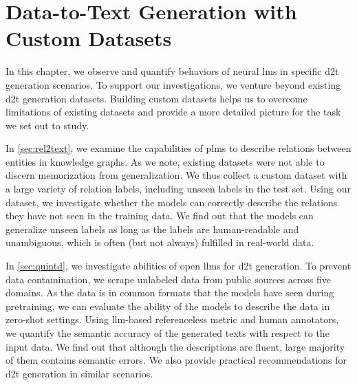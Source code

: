 
\chapter{Data-to-Text Generation with Custom Datasets}
\label{chap:investigating}

In this chapter, we observe and quantify behaviors of neural \acp{lm} in specific \ac{d2t} generation scenarios. To support our investigations, we venture beyond existing \ac{d2t} generation datasets.
Building custom datasets helps us to overcome limitations of existing datasets and provide a more detailed picture for the task we set out to study.

In \autoref{sec:rel2text}, we examine the capabilities of \acp{plm} to describe relations between entities in knowledge graphs. As we note, existing datasets were not able to discern memorization from generalization. We thus collect a custom dataset with a large variety of relation labels, including unseen labels in the test set. Using our dataset, we investigate whether the models can correctly describe the relations they have not seen in the training data. We find out that the models can generalize unseen labels as long as the labels are human-readable and unambiguous, which is often (but not always) fulfilled in real-world data.

In \autoref{sec:quintd}, we investigate abilities of open \acp{llm} for \ac{d2t} generation. To prevent data contamination, we scrape unlabeled data from public sources across five domains. As the data is in common formats that the models have seen during pretraining, we can evaluate the ability of the models to describe the data in zero-shot settings. Using \ac{llm}-based referenceless metric and human annotators, we quantify the semantic accuracy of the generated texts with respect to the input data. We find out that although the descriptions are fluent, large majority of them contains semantic errors. We also provide practical recommendations for \ac{d2t} generation in similar scenarios.

